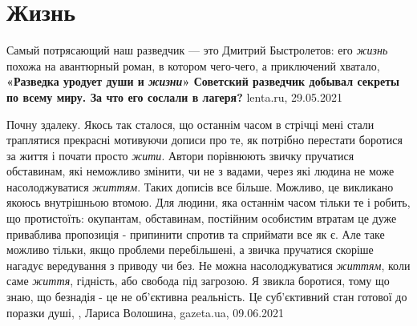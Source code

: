  
 
 
 
 
\chapter{Жизнь}

Самый потрясающий наш разведчик — это Дмитрий Быстролетов: его \emph{жизнь}
похожа на авантюрный роман, в котором чего-чего, а приключений хватало,
\textbf{«Разведка уродует души и \emph{жизни}» Советский разведчик добывал
секреты по всему миру. За что его сослали в лагеря?} lenta.ru, 29.05.2021

Почну здалеку. Якось так сталося, що останнім часом в стрічці мені стали
траплятися прекрасні мотивуючи дописи про те, як потрібно перестати боротися за
життя і почати просто \emph{жити}. Автори порівнюють звичку пручатися обставинам, які
неможливо змінити, чи не з вадами, через які людина не може насолоджуватися
\emph{життям}. Таких дописів все більше. Можливо, це викликано якоюсь внутрішньою
втомою. Для людини, яка останнім часом тільки те і робить, що протистоїть:
окупантам, обставинам, постійним особистим втратам це дуже приваблива
пропозиція - припинити спротив та сприймати все як є. Але таке можливо тільки,
якщо проблеми перебільшені, а звичка пручатися скоріше нагадує вередування з
приводу чи без. Не можна насолоджуватися \emph{життям}, коли саме \emph{життя}, гідність, або
свобода під загрозою. Я звикла боротися, тому що знаю, що безнадія - це не
об'єктивна реальність. Це суб'єктивний стан готової до поразки душі,
, Лариса Волошина, gazeta.ua, 09.06.2021

